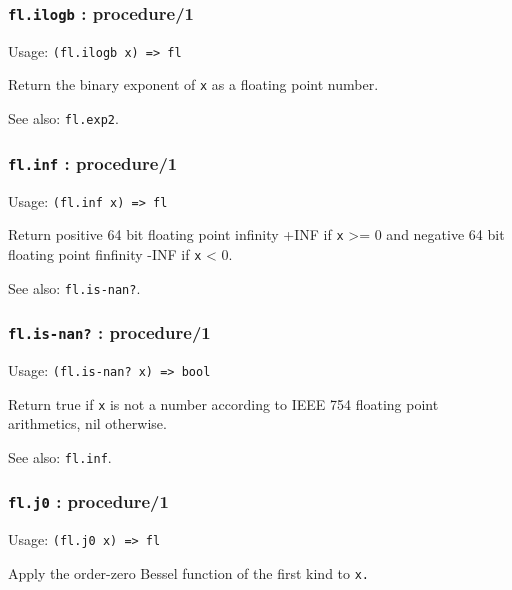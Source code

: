 \documentclass[
]{article}
\newcommand{\passthrough}[1]{#1}
\begin{document}
\hypertarget{fl.ilogb-procedure1}{%
\subsubsection{\texorpdfstring{\texttt{fl.ilogb} :
procedure/1}{fl.ilogb : procedure/1}}\label{fl.ilogb-procedure1}}

Usage: \passthrough{\lstinline!(fl.ilogb x) => fl!}

Return the binary exponent of \passthrough{\lstinline!x!} as a floating
point number.

See also: \passthrough{\lstinline!fl.exp2!}.

\hypertarget{fl.inf-procedure1}{%
\subsubsection{\texorpdfstring{\texttt{fl.inf} :
procedure/1}{fl.inf : procedure/1}}\label{fl.inf-procedure1}}

Usage: \passthrough{\lstinline!(fl.inf x) => fl!}

Return positive 64 bit floating point infinity +INF if
\passthrough{\lstinline!x!} \textgreater= 0 and negative 64 bit floating
point finfinity -INF if \passthrough{\lstinline!x!} \textless{} 0.

See also: \passthrough{\lstinline!fl.is-nan?!}.

\hypertarget{fl.is-nan-procedure1}{%
\subsubsection{\texorpdfstring{\texttt{fl.is-nan?} :
procedure/1}{fl.is-nan? : procedure/1}}\label{fl.is-nan-procedure1}}

Usage: \passthrough{\lstinline!(fl.is-nan? x) => bool!}

Return true if \passthrough{\lstinline!x!} is not a number according to
IEEE 754 floating point arithmetics, nil otherwise.

See also: \passthrough{\lstinline!fl.inf!}.

\hypertarget{fl.j0-procedure1}{%
\subsubsection{\texorpdfstring{\texttt{fl.j0} :
procedure/1}{fl.j0 : procedure/1}}\label{fl.j0-procedure1}}

Usage: \passthrough{\lstinline!(fl.j0 x) => fl!}

Apply the order-zero Bessel function of the first kind to
\passthrough{\lstinline!x.!}
\end{document}
